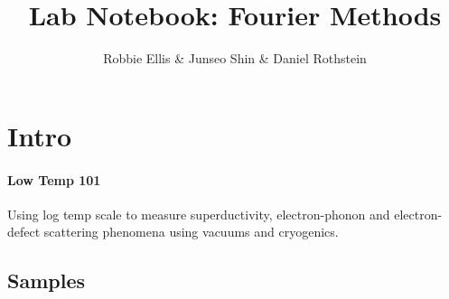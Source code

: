 \documentclass{article}
\author{Robbie Ellis \& Junseo Shin \& Daniel Rothstein}
\date{}
\title{Lab Notebook: Fourier Methods}
\begin{document}
\maketitle
\tableofcontents
\pagebreak


\pagestyle{fancy}

\section*{Intro}

\paragraph{Low Temp 101}
Using log temp scale to measure superductivity, electron-phonon and electron-defect scattering phenomena using vacuums and cryogenics. 

\subsection{Samples}
\end{document}

